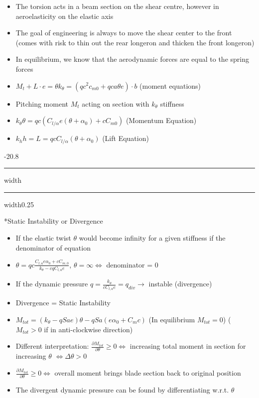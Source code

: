 \documentclass[8pt, landscape, fleqn]{scrartcl}
\makeatletter
\renewcommand{\subsection}{\@startsection{subsection}{1}{0mm}%
{-2\baselineskip}{0.8\baselineskip}%
{\hrule depth 0.2pt width\columnwidth\hrule depth0.75pt
width0.25\columnwidth\vspace*{1.2em}\large\bfseries\rmfamily}}
\makeatother
\begin{document}
\begin{multicols*}{3}
\begin{itemize}
    \item The torsion acts in a beam section on the shear centre, however in aeroelasticity on the elastic axis
    \item The goal of engineering is always to move the shear center to the front (comes with risk to thin out
    the rear longeron and thicken the front longeron)
    \item In equilibrium, we know that the aerodynamic forces are equal to the spring forces
    \item $M_t + L \cdot e = \theta k_\theta = (q c^2 c_{m0}+ qca\theta e)\cdot b$ (moment equations)
    \item Pitching moment $M_t$ acting on section with $k_\theta$ stiffness
    \item $k_\theta \theta = qc (C_{l/\alpha} e (\theta + \alpha_0)+c C_{m0})$ (Momentum Equation)
    \item $k_h h = L = qcC_{l/\alpha } (\theta + \alpha_0)$ (Lift Equation)
\end{itemize}

\subsection*{Static Instability or Divergence}

\begin{itemize}
    \item If the elastic twist $\theta$ would become infinity for a given stiffness if the denominator of equation
    \item $\theta = qc \frac{C_{l,a} e \alpha_0 + c C_{m,0}}{k_\theta - cqC_{l,a}e}$, $\theta = \infty \Leftrightarrow$ denominator = 0
    \item If the dynamic pressure $q = \frac{k_\theta}{c C_{l,a}e} = q_{div} \rightarrow$ instable (divergence)
    \item Divergence = Static Instability
    \item $M_{tot} = (k_{\theta} -q Sae) \theta - qSa (e\alpha_0 + C_mc)$ (In equilibrium $M_{tot} = 0$) ($M_{tot} > 0$ if in anti-clockwise direction)
    \item Different interpretation: $\frac{\partial M_{tot}}{\partial \theta} \geq 0 \Leftrightarrow $ increasing total moment in section for increasing $\theta$ $ \Leftrightarrow \Delta \theta > 0$
    \item $\frac{\partial M_{tot}}{\partial \theta} \geq 0 \Leftrightarrow$ overall moment brings blade section back to original position
    \item The divergent dynamic pressure can be found by differentiating w.r.t. $\theta$ 
\end{itemize}


\end{multicols*}
\end{document}
